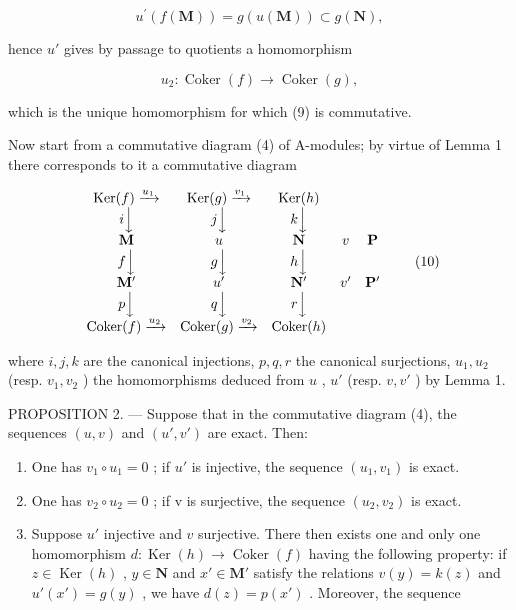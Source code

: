 \[
u ^ {\prime} (f (\mathbf {M})) = g (u (\mathbf {M})) \subset g (\mathbf {N}),
\]

hence \(u'\) gives by passage to quotients a homomorphism

\[
u _ {2}: \operatorname{Coker} (f) \rightarrow \operatorname{Coker} (g),
\]

which is the unique homomorphism for which (9) is commutative.

Now start from a commutative diagram (4) of A-modules; by virtue of Lemma 1 there corresponds to it a commutative diagram

\[
\begin{array}{c c c c c} \operatorname{Ker} (f) \xrightarrow {u _ {1}} & \operatorname{Ker} (g) \xrightarrow {v _ {1}} & \operatorname{Ker} (h) \\ i \Big \downarrow & j \Big \downarrow & k \Big \downarrow \\ \mathbf {M} & u & \mathbf {N} & v & \mathbf {P} \\ f \Big \downarrow & g \Big \downarrow & h \Big \downarrow \\ \mathbf {M} ^ {\prime} & u ^ {\prime} & \mathbf {N} ^ {\prime} & v ^ {\prime} & \mathbf {P} ^ {\prime} \\ p \Big \downarrow & q \Big \downarrow & r \Big \downarrow \\ \operatorname{Coker} (f) \xrightarrow {u _ {2}} & \operatorname{Coker} (g) \xrightarrow {v _ {2}} & \operatorname{Coker} (h) \end{array}\tag{10}
\]

where \(i, j, k\) are the canonical injections, \(p, q, r\) the canonical surjections, \(u_{1}, u_{2}\) (resp. \(v_{1}, v_{2}\) ) the homomorphisms deduced from \(u\) , \(u'\) (resp. \(v, v'\) ) by Lemma 1.

PROPOSITION 2. --- Suppose that in the commutative diagram (4), the sequences \((u, v)\) and \((u', v')\) are exact. Then:

\begin{enumerate}
\def\labelenumi{(\roman{enumi})}
\item
  One has \(v_{1} \circ u_{1} = 0\) ; if \(u'\) is injective, the sequence \((u_{1}, v_{1})\) is exact.
\item
  One has \(v_2 \circ u_2 = 0\) ; if v is surjective, the sequence \((u_2, v_2)\) is exact.
\item
  Suppose \(u'\) injective and \(v\) surjective. There then exists one and only one homomorphism \(d: \operatorname{Ker}(h) \to \operatorname{Coker}(f)\) having the following property: if \(z \in \operatorname{Ker}(h)\) , \(y \in \mathbf{N}\) and \(x' \in \mathbf{M}'\) satisfy the relations \(v(y) = k(z)\) and \(u'(x') = g(y)\) , we have \(d(z) = p(x')\) . Moreover, the sequence
\end{enumerate}

